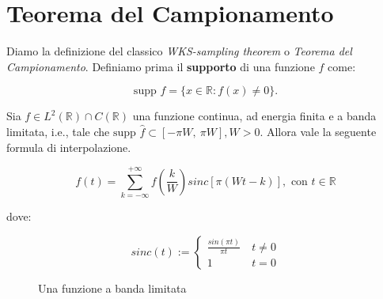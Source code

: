 
\section{Teorema del Campionamento}


Diamo la definizione del classico \textit{WKS-sampling theorem} o
\textit{Teorema del Campionamento}. Definiamo prima il \textbf{supporto}
di una funzione $f$ come:

$$
    \text{supp } f = \{ x \in \mathbb{R} : f(x) \neq 0 \}.
$$

\begin{theorem}
    Sia $f \in L^2(\mathbb{R}) \cap C(\mathbb{R})$ una funzione continua, ad energia finita e
    a banda limitata, i.e., tale che
    $\text{supp } \hat{f} \subset \left[ -\pi W, \ \pi W\right], W > 0$.
    Allora vale la seguente formula di interpolazione.

    $$
        f(t) = \sum_{k = - \infty}^{+\infty} f \left(\frac{k}{W}\right) sinc \left[ \pi(Wt - k) \right], \text{ con } t \in \mathbb{R}
    $$

    dove:

    $$
        sinc(t) :=
        \left\{ \begin{array}{cl}
            \frac{sin(\pi t)}{\pi t} & \ t \neq 0 \\
            1                        & \ t = 0
        \end{array} \right.
    $$
\end{theorem}


\begin{figure}[H]
    \centering
{}
    \caption{Una funzione a banda limitata}
\end{figure}

